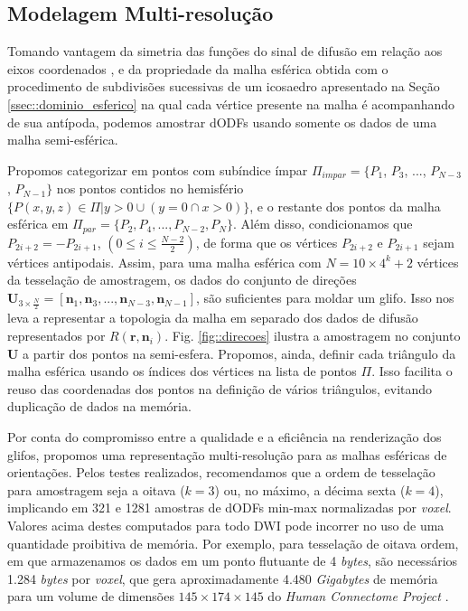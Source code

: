 \subsection{Modelagem Multi-resolução}
\label{ssec:modelagem_multiresolucao}

Tomando vantagem da simetria das funções do sinal de difusão em relação aos eixos coordenados \cite{descoteaux2015}, e da propriedade da malha esférica obtida com o procedimento de subdivisões sucessivas de um icosaedro apresentado na Seção \ref{ssec::dominio_esferico} na qual cada vértice presente na malha é acompanhando de sua antípoda, podemos amostrar dODFs usando somente os dados de uma malha semi-esférica.

Propomos categorizar em pontos com subíndice ímpar $\Pi_{impar} = \{P_1$,
$P_3$, ...,
$P_{N-3}$,
$P_{N-1}\}$ nos pontos contidos no hemisfério $\{P(x, y, z) \in \Pi | y > 0 \cup (y = 0 \cap x > 0)\}$, e o restante dos pontos da malha esférica em $\Pi_{par} = \{P_2, P_4, ..., P_{N-2}, P_{N}\}$. Além disso, condicionamos que $P_{2i+2} = -P_{2i+1}$, $(0 \leq i \leq \frac{N-2}{2})$, de forma que os vértices $P_{2i+2}$ e $P_{2i+1}$ sejam vértices antipodais. Assim, para uma malha esférica com $N = 10 \times 4^k + 2$ vértices da tesselação de amostragem, os dados do conjunto de direções $\mathbf{U}_{3\times \frac{N}{2}} = [
\mathbf{n}_1,
\mathbf{n}_3, ..., 
\mathbf{n}_{N-3},
\mathbf{n}_{N-1}
]$, são suficientes para moldar um glifo. Isso nos leva a representar a topologia da malha em separado dos dados de difusão representados por $R(\mathbf{r},\mathbf{n}_i)$. Fig. \ref{fig::direcoes} ilustra a amostragem no conjunto $\mathbf{U}$ a partir dos pontos na semi-esfera. Propomos, ainda, definir cada triângulo da malha esférica usando os índices dos vértices na lista de pontos $\Pi$. Isso facilita o reuso das coordenadas dos pontos na definição de vários triângulos, evitando duplicação de dados na memória. 

Por conta do compromisso entre a qualidade e a eficiência na renderização dos glifos, propomos uma representação multi-resolução para as malhas esféricas de orientações. Pelos testes realizados, recomendamos que a ordem de tesselação para amostragem seja a oitava ($k=3$) ou, no máximo, a décima sexta ($k=4$), implicando em 321 e 1281 amostras de dODFs min-max normalizadas por \textit{voxel}. Valores acima destes computados para todo DWI pode incorrer no uso de uma quantidade proibitiva de memória. Por exemplo, para tesselação de oitava ordem, em que armazenamos os dados em um ponto flutuante de 4 \textit{bytes}, são necessários 1.284 \textit{bytes} por \textit{voxel}, que gera aproximadamente 4.480 \textit{Gigabytes} de memória para um volume de dimensões $145 \times 174 \times 145$ do \textit{Human Connectome Project} \cite{essen2012}.

